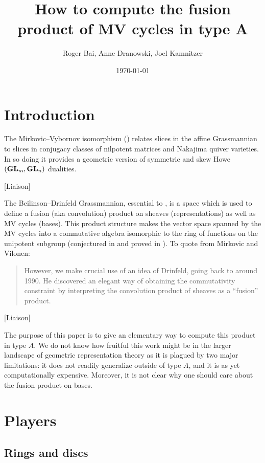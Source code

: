 \documentclass[draft]{article}
\title{How to compute the fusion product of MV cycles in type A}
\author{Roger Bai, Anne Dranowski, Joel Kamnitzer}
\date{\today}
\begin{document}
\maketitle

\section{Introduction}
% 
The Mirkovic--Vybornov isomorphism (\cite{mirkovic2007quiver,mirkovic2019comparison}) relates slices in the affine Grassmannian to slices in conjugacy classes of nilpotent matrices and Nakajima quiver varieties. In so doing it provides a geometric version of symmetric and skew Howe $({\mathbf{GL}}_m,{\mathbf{GL}}_n)$ dualities. 
% 

[Liaison]

The Beilinson--Drinfeld Grassmannian, essential to \cite{mirkovic2007geometric}, is a space which is used to define a fusion (aka convolution) product on sheaves (representations) as well as MV cycles (bases). 
% 
This product structure makes the vector space spanned by the MV cycles into a commutative algebra isomorphic to the ring of functions on the unipotent subgroup (conjectured in \cite{anderson2003polytope} and proved in \cite{baumann2019mirkovic}). %
% 
To quote from Mirkovic and Vilonen:
\begin{quotation}
    However, we make crucial use of an idea of Drinfeld, going back to around 1990. He discovered an elegant way of obtaining the commutativity constraint by interpreting the convolution product of sheaves as a ``fusion'' product.
\end{quotation}
% 
[Liaison]

The purpose of this paper is to give an elementary way to compute this product in type $A$. We do not know how fruitful this work might be in the larger landscape of geometric representation theory as it is plagued by two major limitations: it does not readily generalize outside of type $A$, and it is as yet computationally expensive. 
% 
Moreover, it is not clear why one should care about the fusion product on bases.     

\section{Players}

\subsection{Rings and discs}
\end{document}
